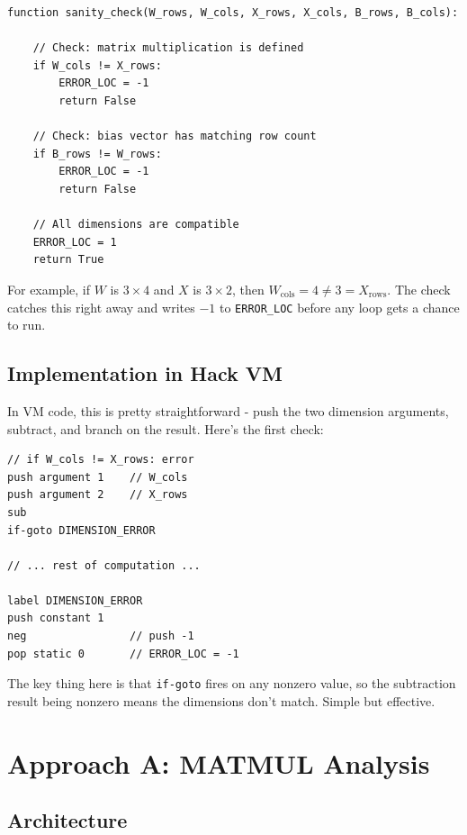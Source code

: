 \documentclass[12pt,a4paper]{article}
\begin{document}
\begin{lstlisting}[style=pseudo, caption={Matrix dimension validation logic}]
function sanity_check(W_rows, W_cols, X_rows, X_cols, B_rows, B_cols):

    // Check: matrix multiplication is defined
    if W_cols != X_rows:
        ERROR_LOC = -1
        return False

    // Check: bias vector has matching row count
    if B_rows != W_rows:
        ERROR_LOC = -1
        return False

    // All dimensions are compatible
    ERROR_LOC = 1
    return True
\end{lstlisting}

For example, if $W$ is $3 \times 4$ and $X$ is $3 \times 2$, then $W_{\text{cols}} = 4 \neq 3 = X_{\text{rows}}$. The check catches this right away and writes $-1$ to \texttt{ERROR\_LOC} before any loop gets a chance to run.

\subsection{Implementation in Hack VM}

In VM code, this is pretty straightforward - push the two dimension arguments, subtract, and branch on the result. Here's the first check:

\begin{lstlisting}[style=hackvm, caption={VM-level dimension mismatch check}]
// if W_cols != X_rows: error
push argument 1    // W_cols
push argument 2    // X_rows
sub
if-goto DIMENSION_ERROR

// ... rest of computation ...

label DIMENSION_ERROR
push constant 1
neg                // push -1
pop static 0       // ERROR_LOC = -1
\end{lstlisting}

The key thing here is that \texttt{if-goto} fires on any nonzero value, so the subtraction result being nonzero means the dimensions don't match. Simple but effective.

\section{Approach A: MATMUL Analysis}

\subsection{Architecture}
\end{document}
